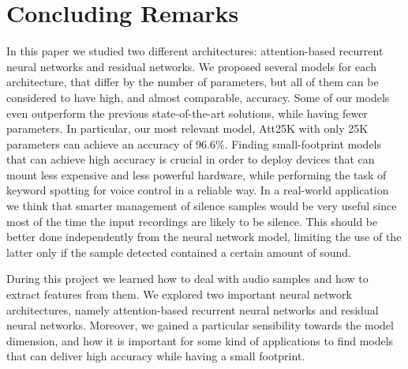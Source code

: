 
\section{Concluding Remarks}
\label{sec:conclusions}

In this paper we studied two different architectures: attention-based recurrent neural networks and residual networks. We proposed several models for each architecture, that differ by the number of parameters, but all of them can be considered to have high, and almost comparable, accuracy. Some of our models even outperform the previous state-of-the-art solutions, while having fewer parameters. In particular, our most relevant model, Att25K with only 25K parameters can achieve an accuracy of 96.6\%. Finding small-footprint models that can achieve high accuracy is crucial in order to deploy devices that can mount less expensive and less powerful hardware, while performing the task of keyword spotting for voice control in a reliable way.
In a real-world application we think that smarter management of silence samples would be very useful since most of the time the input recordings are likely to be silence. This should be better done independently from the neural network model, limiting the use of the latter only if the sample detected contained a certain amount of sound.

During this project we learned how to deal with audio samples and how to extract features from them. We explored two important neural network architectures, namely attention-based recurrent neural networks and residual neural networks.
Moreover, we gained a particular sensibility towards the model dimension, and how it is important for some kind of applications to find models that can deliver high accuracy while having a small footprint.
